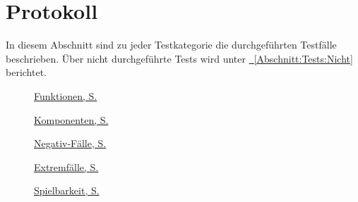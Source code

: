 %



\newpage



\section{Protokoll}
\label{Abschnitt:Tests:Protokoll}

In diesem Abschnitt sind zu jeder Testkategorie die durchgeführten Testfälle beschrieben. Über nicht durchgeführte Tests wird unter \hyperref[Abschnitt:Tests:Nicht]{\mousecursor~\ref*{Abschnitt:Tests:Nicht}} berichtet.\\



\begin{description}

	\item[\mousecursor]
	\hyperref[Abschnitt:Tests:Protokoll:Funktion]{Funktionen, S. \pageref{Abschnitt:Tests:Protokoll:Funktion}}
	
	\item[\mousecursor]
	\hyperref[Abschnitt:Tests:Protokoll:Komponenten]{Komponenten, S. \pageref{Abschnitt:Tests:Protokoll:Komponenten}}
	
	\item[\mousecursor]
	\hyperref[Abschnitt:Tests:Protokoll:Negativ]{Negativ-Fälle, S. \pageref{Abschnitt:Tests:Protokoll:Negativ}}
	
	\item[\mousecursor]
	\hyperref[Abschnitt:Tests:Protokoll:Extrem]{Extremfälle, S. \pageref{Abschnitt:Tests:Protokoll:Extrem}}
	
	\item[\mousecursor]
	\hyperref[Abschnitt:Tests:Protokoll:Abnahme]{Spielbarkeit, S. \pageref{Abschnitt:Tests:Protokoll:Abnahme}}
	
\end{description}


